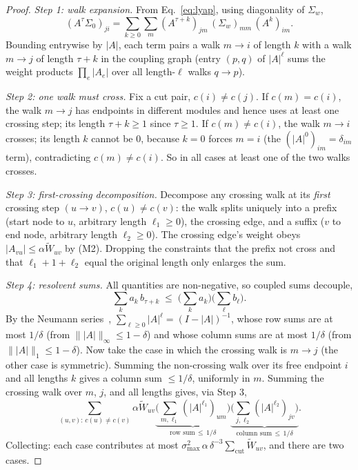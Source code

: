 \documentclass[11pt]{article}
\theoremstyle{definition}
\theoremstyle{remark}
\newcommand{\Wt}{\widetilde{W}}
\begin{document}
\begin{proof}
    \emph{Step 1: walk expansion.}
    From Eq.~\eqref{eq:lyap}, using diagonality of $\Sigma_w$,
    \begin{equation}
        (A^\tau \Sigma_0)_{ji}
        = \sum_{k \geq 0} \sum_{m}
        (A^{\tau + k})_{jm}\, (\Sigma_w)_{mm}\, (A^{k})_{im}.
        \label{eq:walkpair}
    \end{equation}
    Bounding entrywise by $|A|$, each term pairs a walk $m \to i$ of length
    $k$ with a walk $m \to j$ of length $\tau + k$ in the coupling graph
    (entry $(p, q)$ of $|A|^{\ell}$ sums the weight products
    $\prod_e |A_e|$ over all length-$\ell$ walks $q \to p$).

    \emph{Step 2: one walk must cross.}
    Fix a cut pair, $c(i) \neq c(j)$.
    If $c(m) = c(i)$, the walk $m \to j$ has endpoints in different modules
    and hence uses at least one crossing step; its length $\tau + k \geq 1$
    since $\tau \geq 1$.
    If $c(m) \neq c(i)$, the walk $m \to i$ crosses; its length $k$ cannot be
    $0$, because $k = 0$ forces $m = i$ (the $(|A|^0)_{im} = \delta_{im}$
        term), contradicting $c(m) \neq c(i)$.
        So in all cases at least one of the two walks crosses.

        \emph{Step 3: first-crossing decomposition.}
        Decompose any crossing walk at its \emph{first} crossing step
    $(u \to v)$, $c(u) \neq c(v)$: the walk splits uniquely into a prefix
        (start node to $u$, arbitrary length $\ell_1 \geq 0$), the crossing edge,
        and a suffix ($v$ to end node, arbitrary length $\ell_2 \geq 0$).
        The crossing edge's weight obeys $|A_{vu}| \leq \alpha \Wt_{uv}$ by (M2).
        Dropping the constraints that the prefix not cross and that
    $\ell_1 + 1 + \ell_2$ equal the original length only enlarges the sum.

        \emph{Step 4: resolvent sums.}
        All quantities are non-negative, so coupled sums decouple,
        \[
        \textstyle
        \sum_k a_k\, b_{\tau + k}
        \;\leq\;
        \big(\sum_k a_k\big)\big(\sum_\ell b_\ell\big).
    \]
    By the Neumann series~\citep[Ch.~5]{horn2013matrix},
    $\sum_{\ell \geq 0} |A|^{\ell} = (I - |A|)^{-1}$, whose row sums are at
    most $1/\delta$ (from $\| |A| \|_\infty \leq 1 - \delta$) and whose column
    sums are at most $1/\delta$ (from $\| |A| \|_1 \leq 1 - \delta$).
    Now take the case in which the crossing walk is $m \to j$ (the other case
    is symmetric).
    Summing the non-crossing walk over its free endpoint $i$ and all lengths
    $k$ gives a column sum $\leq 1/\delta$, uniformly in $m$.
    Summing the crossing walk over $m$, $j$, and all lengths gives, via
    Step 3,
    \[
        \sum_{(u,v):\, c(u) \neq c(v)} \alpha \Wt_{uv}
        \underbrace{\Big(\sum_{m, \ell_1} (|A|^{\ell_1})_{um}\Big)}_{\text{row
                sum} \, \leq\, 1/\delta}
        \underbrace{\Big(\sum_{j, \ell_2} (|A|^{\ell_2})_{jv}\Big)}_{\text{column
                sum} \, \leq\, 1/\delta}.
    \]
    Collecting: each case contributes at most
    $\sigma_{\max}^2\, \alpha\, \delta^{-3} \sum_{\mathrm{cut}} \Wt_{uv}$, and
    there are two cases.
\end{proof}
\end{document}
